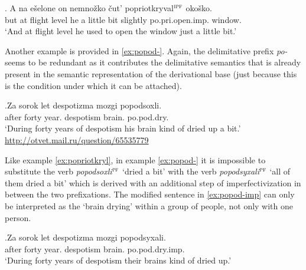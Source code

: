 \exg. \label{ex:popriotkryval:mod}A na e\v{s}elone on nemno\v{z}ko \v{c}ut' popriotkryval$^{\textsc{ipf}}$ oko\v{s}ko.\\
but at {flight level} he {a little bit} {slightly} po.pri.open.imp. window.\\
\trans `And at flight level he used to open the window just a little bit.'

Another example is provided in \ref{ex:popod-}. Again, the delimitative  prefix \textit{po-}   seems to be redundant as it contributes the delimitative  semantics that is already present in the semantic representation of the derivational base (just because this is the condition under which it can be attached).

\exg.\label{ex:popod-}Za sorok let despotizma mozgi popodsoxli.\\
after forty year. despotism brain. po.pod.dry.\\
\trans `During forty years of despotism his brain kind of dried up a bit.'\\\hbox{}\hfill\hbox{\url{http://otvet.mail.ru/question/65535779}}

Like example \ref{ex:popriotkryl}, in example \ref{ex:popod-} it is impossible to substitute the verb \textit{popodsoxli}$^{\textsc{pf}}$ `dried a bit' with the verb \textit{popodsyxali}$^{\textsc{pf}}$ `all of them dried a bit' which is derived with an additional step of imperfectivization  in between the two prefixations. The modified sentence in \ref{ex:popod-imp} can only be interpreted as the `brain drying' within a group of people, not only with one person.  

\exg.\label{ex:popod-imp}Za sorok let despotizma mozgi popodsyxali.\\
after forty year. despotism brain. po.pod.dry.imp.\\
\trans `During forty years of despotism their brains kind of dried up.'

